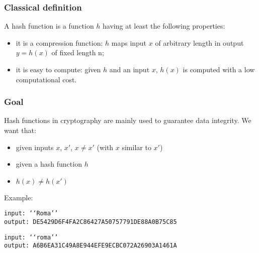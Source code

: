 \documentclass[a4paper, 10pt, titlepage]{article}
\begin{document}
\subsubsection*{Classical definition}
A hash function is a function $h$ having at least the following properties:
\begin{itemize}
\item it is a compression function: $h$ maps input $x$ of arbitrary length in output $y = h(x)$ of fixed length n;
\item it is easy to compute: given $h$ and an input $x$, $h(x)$ is computed with a low computational cost.
\end{itemize}
\subsubsection*{Goal}
Hash functions in cryptography are mainly used to guarantee data
integrity. We want that:
\begin{itemize}
\item given inputs $x$, $x'$, $x \neq x'$ (with $x$ similar to $x'$)
\item given a hash function $h$
\item $h(x) \neq h(x')$
\end{itemize}
Example:
\begin{verbatim}
input: ‘‘Roma’’
output: DE5429D6F4FA2C86427A50757791DE88A0B75C85
\end{verbatim}
\begin{verbatim}
input: ‘‘roma’’
output: A6B6EA31C49A8E944EFE9ECBC072A26903A1461A
\end{verbatim}
\end{document}
